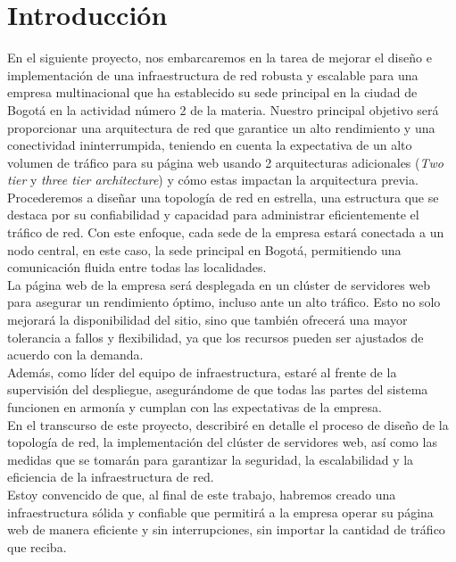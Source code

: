 \section{Introducción}

En el siguiente proyecto, nos embarcaremos en la tarea de mejorar el diseño e
implementación de una infraestructura de red robusta y escalable para una empresa multinacional
que ha establecido su sede principal en la ciudad de Bogotá en la actividad
número 2 de la materia. Nuestro principal
objetivo será proporcionar una arquitectura de red que garantice un alto
rendimiento y una conectividad ininterrumpida, teniendo en cuenta la
expectativa de un alto volumen de tráfico para su página web usando 2
arquitecturas adicionales (\textit{Two tier} y \textit{three tier architecture})
y cómo estas impactan la arquitectura previa.
\\

Procederemos a diseñar una topología de red en estrella, una estructura que se
destaca por su confiabilidad y capacidad para administrar eficientemente el
tráfico de red. Con este enfoque, cada sede de la empresa estará conectada a un
nodo central, en este caso, la sede principal en Bogotá, permitiendo una
comunicación fluida entre todas las localidades.
\\

La página web de la empresa será desplegada en un clúster de servidores web
para asegurar un rendimiento óptimo, incluso ante un alto tráfico. Esto no
solo mejorará la disponibilidad del sitio, sino que también ofrecerá una mayor
tolerancia a fallos y flexibilidad, ya que los recursos pueden ser ajustados de
acuerdo con la demanda.
\\

Además, como líder del equipo de infraestructura, estaré al frente de la
supervisión del despliegue, asegurándome de que todas las partes del sistema
funcionen en armonía y cumplan con las expectativas de la empresa.
\\

En el transcurso de este proyecto, describiré en detalle el proceso de diseño
de la topología de red, la implementación del clúster de servidores web, así
como las medidas que se tomarán para garantizar la seguridad, la escalabilidad
y la eficiencia de la infraestructura de red.
\\

Estoy convencido de que, al final de este trabajo, habremos creado una
infraestructura sólida y confiable que permitirá a la empresa operar su página
web de manera eficiente y sin interrupciones, sin importar la cantidad de
tráfico que reciba.

